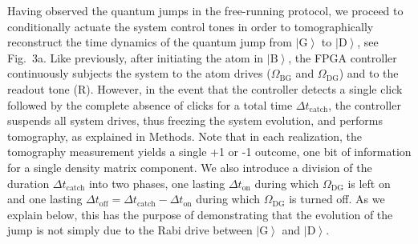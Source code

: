 \documentclass[
	 			preprint,     		superscriptaddress, 																longbibliography,
		amsmath, amssymb,
		aps,  prb,   		floatfix,
		linenumbers     
	]{revtex4-1}
\newcommand{\ket}[1]{\left|#1\right>}
\begin{document}
Having observed the quantum jumps in the free-running protocol, we  proceed to conditionally actuate the system control tones in order to tomographically reconstruct the time dynamics of the quantum jump from $\ket{\mathrm{G}}$ to $\ket{\mathrm{D}}$, see Fig.~3a.
Like previously, after initiating the atom in $\ket{\mathrm{B}}$, the FPGA controller continuously subjects the system to the atom drives ($\Omega_\mathrm{BG}$ and $\Omega_\mathrm{DG}$) and to the readout tone ($\mathrm R$).
However, in the event that the controller detects a single click followed by the complete absence of clicks for a total time $\Delta t_{\operatorname{catch}}$, the controller suspends all system drives, thus freezing the system evolution, and performs tomography, as explained in Methods. 
Note that in each realization, the tomography measurement yields a single +1 or -1 outcome, one bit of information for a single density matrix component. 
We also introduce a division of the duration $\Delta t_{\operatorname{catch}}$ into two phases, one lasting $\Delta t_\mathrm{on}$ during which $\Omega_\mathrm{DG}$ is left on and one lasting $\Delta t_\mathrm{off} = \Delta t_{\operatorname{catch}}- \Delta t_\mathrm{on}$ during which $\Omega_\mathrm{DG}$ is turned off. 
As we explain below, this has the purpose of demonstrating that the evolution of the jump is not simply due to the Rabi drive between $\ket{\mathrm{G}}$ and $\ket{\mathrm{D}}$.  
\end{document}
